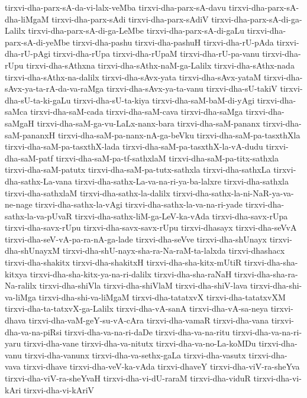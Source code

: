 {tirxvi-dha-parx-sA-da-vi-lalx-veMba
tirxvi-dha-parx-sA-davu
tirxvi-dha-parx-sA-dha-liMgaM
tirxvi-dha-parx-sAdi
tirxvi-dha-parx-sAdiV
tirxvi-dha-parx-sA-di-ga-Lalilx
tirxvi-dha-parx-sA-di-ga-LeMbe
tirxvi-dha-parx-sA-di-gaLu
tirxvi-dha-parx-sA-di-yeMbe
tirxvi-dha-pashu
tirxvi-dha-pashuH
tirxvi-dha-rU-pAda
tirxvi-dha-rU-pAgi
tirxvi-dha-rUpa
tirxvi-dha-rUpaM
tirxvi-dha-rU-pa-vanu
tirxvi-dha-rUpu
tirxvi-dha-sAthxna
tirxvi-dha-sAthx-naM-ga-Lalilx
tirxvi-dha-sAthx-nada
tirxvi-dha-sAthx-na-dalilx
tirxvi-dha-sAvx-yata
tirxvi-dha-sAvx-yataM
tirxvi-dha-sAvx-ya-ta-rA-da-va-raMga
tirxvi-dha-sAvx-ya-ta-vanu
tirxvi-dha-sU-takiV
tirxvi-dha-sU-ta-ki-gaLu
tirxvi-dha-sU-ta-kiya
tirxvi-dha-saM-baM-di-yAgi
tirxvi-dha-saMca
tirxvi-dha-saM-cada
tirxvi-dha-saM-cava
tirxvi-dha-saMga
tirxvi-dha-saMgaH
tirxvi-dha-saM-ga-vu-LaLx-nanx-bara
tirxvi-dha-saM-pananx
tirxvi-dha-saM-pananxH
tirxvi-dha-saM-pa-nanx-nA-ga-beVku
tirxvi-dha-saM-pa-tasxthXla
tirxvi-dha-saM-pa-tasxthX-lada
tirxvi-dha-saM-pa-tasxthX-la-vA-dudu
tirxvi-dha-saM-patf
tirxvi-dha-saM-pa-tf-sathxlaM
tirxvi-dha-saM-pa-titx-sathxla
tirxvi-dha-saM-patutx
tirxvi-dha-saM-pa-tutx-sathxla
tirxvi-dha-sathxLa
tirxvi-dha-sathx-La-vana
tirxvi-dha-sathx-La-va-na-ri-ya-ba-lalxre
tirxvi-dha-sathxla
tirxvi-dha-sathxlaM
tirxvi-dha-sathx-la-dalilx
tirxvi-dha-sathx-la-ni-NaR-ya-va-ne-nage
tirxvi-dha-sathx-la-vAgi
tirxvi-dha-sathx-la-va-na-ri-yade
tirxvi-dha-sathx-la-va-pUvaR
tirxvi-dha-sathx-liM-ga-LeV-ka-vAda
tirxvi-dha-savx-rUpa
tirxvi-dha-savx-rUpu
tirxvi-dha-savx-savx-rUpu
tirxvi-dhasayx
tirxvi-dha-seVvA
tirxvi-dha-seV-vA-pa-ra-nA-ga-lade
tirxvi-dha-seVve
tirxvi-dha-shUnayx
tirxvi-dha-shUnayxM
tirxvi-dha-shU-nayx-sha-ra-Na-raM-ta-lalxda
tirxvi-dhashacx
tirxvi-dha-shakitx
tirxvi-dha-shakitxH
tirxvi-dha-sha-kitx-mUtiR
tirxvi-dha-sha-kitxya
tirxvi-dha-sha-kitx-ya-na-ri-dalilx
tirxvi-dha-sha-raNaH
tirxvi-dha-sha-ra-Na-ralilx
tirxvi-dha-shiVla
tirxvi-dha-shiVlaM
tirxvi-dha-shiV-lava
tirxvi-dha-shi-va-liMga
tirxvi-dha-shi-va-liMgaM
tirxvi-dha-tatatxvX
tirxvi-dha-tatatxvXM
tirxvi-dha-ta-tatxvX-ga-Lalilx
tirxvi-dha-vA-sanA
tirxvi-dha-vA-sa-neya
tirxvi-dhava
tirxvi-dha-vaM-geY-su-vA-cAra
tirxvi-dha-vamaR
tirxvi-dha-vana
tirxvi-dha-va-na-piRsi
tirxvi-dha-va-na-ri-daDe
tirxvi-dha-va-na-ritu
tirxvi-dha-va-na-ri-yaru
tirxvi-dha-vane
tirxvi-dha-va-nitutx
tirxvi-dha-va-no-La-koMDu
tirxvi-dha-vanu
tirxvi-dha-vanunx
tirxvi-dha-va-sethx-gaLa
tirxvi-dha-vasutx
tirxvi-dha-vava
tirxvi-dhave
tirxvi-dha-veV-ka-vAda
tirxvi-dhaveY
tirxvi-dha-viV-ra-sheYva
tirxvi-dha-viV-ra-sheYvaH
tirxvi-dha-vi-dU-raraM
tirxvi-dha-viduR
tirxvi-dha-vi-kAri
tirxvi-dha-vi-kAriV
}
